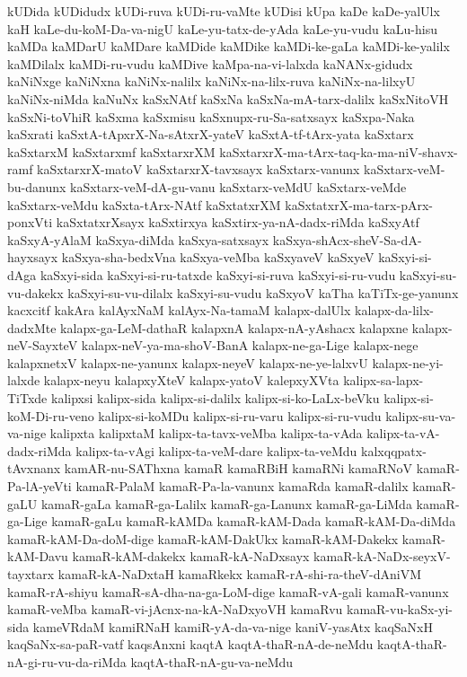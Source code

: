 {kUDida
kUDidudx
kUDi-ruva
kUDi-ru-vaMte
kUDisi
kUpa
kaDe
kaDe-yalUlx
kaH
kaLe-du-koM-Da-va-nigU
kaLe-yu-tatx-de-yAda
kaLe-yu-vudu
kaLu-hisu
kaMDa
kaMDarU
kaMDare
kaMDide
kaMDike
kaMDi-ke-gaLa
kaMDi-ke-yalilx
kaMDilalx
kaMDi-ru-vudu
kaMDive
kaMpa-na-vi-lalxda
kaNANx-gidudx
kaNiNxge
kaNiNxna
kaNiNx-nalilx
kaNiNx-na-lilx-ruva
kaNiNx-na-lilxyU
kaNiNx-niMda
kaNuNx
kaSxNAtf
kaSxNa
kaSxNa-mA-tarx-dalilx
kaSxNitoVH
kaSxNi-toVhiR
kaSxma
kaSxmisu
kaSxnupx-ru-Sa-satxsayx
kaSxpa-Naka
kaSxrati
kaSxtA-tApxrX-Na-sAtxrX-yateV
kaSxtA-tf-tArx-yata
kaSxtarx
kaSxtarxM
kaSxtarxmf
kaSxtarxrXM
kaSxtarxrX-ma-tArx-taq-ka-ma-niV-shavx-ramf
kaSxtarxrX-matoV
kaSxtarxrX-tavxsayx
kaSxtarx-vanunx
kaSxtarx-veM-bu-danunx
kaSxtarx-veM-dA-gu-vanu
kaSxtarx-veMdU
kaSxtarx-veMde
kaSxtarx-veMdu
kaSxta-tArx-NAtf
kaSxtatxrXM
kaSxtatxrX-ma-tarx-pArx-ponxVti
kaSxtatxrXsayx
kaSxtirxya
kaSxtirx-ya-nA-dadx-riMda
kaSxyAtf
kaSxyA-yAlaM
kaSxya-diMda
kaSxya-satxsayx
kaSxya-shAcx-sheV-Sa-dA-hayxsayx
kaSxya-sha-bedxVna
kaSxya-veMba
kaSxyaveV
kaSxyeV
kaSxyi-si-dAga
kaSxyi-sida
kaSxyi-si-ru-tatxde
kaSxyi-si-ruva
kaSxyi-si-ru-vudu
kaSxyi-su-vu-dakekx
kaSxyi-su-vu-dilalx
kaSxyi-su-vudu
kaSxyoV
kaTha
kaTiTx-ge-yanunx
kacxcitf
kakAra
kalAyxNaM
kalAyx-Na-tamaM
kalapx-dalUlx
kalapx-da-lilx-dadxMte
kalapx-ga-LeM-dathaR
kalapxnA
kalapx-nA-yAshacx
kalapxne
kalapx-neV-SayxteV
kalapx-neV-ya-ma-shoV-BanA
kalapx-ne-ga-Lige
kalapx-nege
kalapxnetxV
kalapx-ne-yanunx
kalapx-neyeV
kalapx-ne-ye-lalxvU
kalapx-ne-yi-lalxde
kalapx-neyu
kalapxyXteV
kalapx-yatoV
kalepxyXVta
kalipx-sa-lapx-TiTxde
kalipxsi
kalipx-sida
kalipx-si-dalilx
kalipx-si-ko-LaLx-beVku
kalipx-si-koM-Di-ru-veno
kalipx-si-koMDu
kalipx-si-ru-varu
kalipx-si-ru-vudu
kalipx-su-va-va-nige
kalipxta
kalipxtaM
kalipx-ta-tavx-veMba
kalipx-ta-vAda
kalipx-ta-vA-dadx-riMda
kalipx-ta-vAgi
kalipx-ta-veM-dare
kalipx-ta-veMdu
kalxqqpatx-tAvxnanx
kamAR-nu-SAThxna
kamaR
kamaRBiH
kamaRNi
kamaRNoV
kamaR-Pa-lA-yeVti
kamaR-PalaM
kamaR-Pa-la-vanunx
kamaRda
kamaR-dalilx
kamaR-gaLU
kamaR-gaLa
kamaR-ga-Lalilx
kamaR-ga-Lanunx
kamaR-ga-LiMda
kamaR-ga-Lige
kamaR-gaLu
kamaR-kAMDa
kamaR-kAM-Dada
kamaR-kAM-Da-diMda
kamaR-kAM-Da-doM-dige
kamaR-kAM-DakUkx
kamaR-kAM-Dakekx
kamaR-kAM-Davu
kamaR-kAM-dakekx
kamaR-kA-NaDxsayx
kamaR-kA-NaDx-seyxV-tayxtarx
kamaR-kA-NaDxtaH
kamaRkekx
kamaR-rA-shi-ra-theV-dAniVM
kamaR-rA-shiyu
kamaR-sA-dha-na-ga-LoM-dige
kamaR-vA-gali
kamaR-vanunx
kamaR-veMba
kamaR-vi-jAcnx-na-kA-NaDxyoVH
kamaRvu
kamaR-vu-kaSx-yi-sida
kameVRdaM
kamiRNaH
kamiR-yA-da-va-nige
kaniV-yasAtx
kaqSaNxH
kaqSaNx-sa-paR-vatf
kaqsAnxni
kaqtA
kaqtA-thaR-nA-de-neMdu
kaqtA-thaR-nA-gi-ru-vu-da-riMda
kaqtA-thaR-nA-gu-va-neMdu
}
